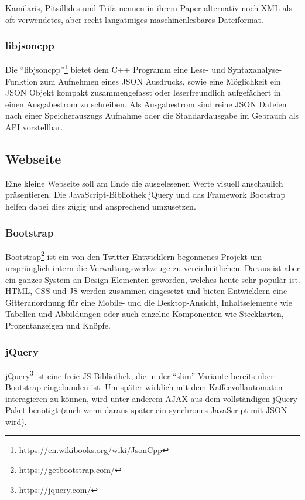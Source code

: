 Kamilaris, Pitsillides und Trifa nennen in ihrem Paper \cite{Kamilaris2011} alternativ noch \ac{XML} als oft verwendetes, aber recht langatmiges maschinenlesbares Dateiformat.

\subsubsection{libjsoncpp}
Die "`libjsoncpp"'\footnote{\url{https://en.wikibooks.org/wiki/JsonCpp}} bietet dem C++ Programm eine Lese- und Syntaxanalyse-Funktion zum Aufnehmen eines \ac{JSON} Ausdrucks, sowie eine Möglichkeit ein \ac{JSON} Objekt kompakt zusammengefasst oder leserfreundlich aufgefächert in einen Ausgabestrom zu schreiben.
Als Ausgabestrom sind reine \ac{JSON} Dateien nach einer Speicherauszugs Aufnahme oder die Standardausgabe im Gebrauch als API vorstellbar.


\subsection{Webseite}
Eine kleine Webseite soll am Ende die ausgelesenen Werte visuell anschaulich präsentieren.
Die JavaScript-Bibliothek jQuery und das Framework Bootstrap helfen dabei dies zügig und ansprechend umzusetzen.

\subsubsection{Bootstrap}
Bootstrap\footnote{\url{https://getbootstrap.com/}} ist ein von den Twitter Entwicklern begonnenes Projekt um ursprünglich intern die Verwaltungswerkzeuge zu vereinheitlichen.
Daraus ist aber ein ganzes System an Design Elementen geworden, welches heute sehr populär ist.
\ac{HTML}, \ac{CSS} und \ac{JS} werden zusammen eingesetzt und bieten Entwicklern eine Gitteranordnung für eine Mobile- und die Desktop-Ansicht, Inhaltselemente wie Tabellen und Abbildungen oder auch einzelne Komponenten wie Steckkarten, Prozentanzeigen und Knöpfe.

\subsubsection{jQuery}
jQuery\footnote{\url{https://jquery.com/}} ist eine freie \ac{JS}-Bibliothek, die in der "`slim"'-Variante bereits über Bootstrap eingebunden ist.
Um später wirklich mit dem Kaffeevollautomaten interagieren zu können, wird unter anderem \ac{AJAX} aus dem vollständigen jQuery Paket benötigt (auch wenn daraus später ein synchrones JavaScript mit \acs{JSON} wird).

